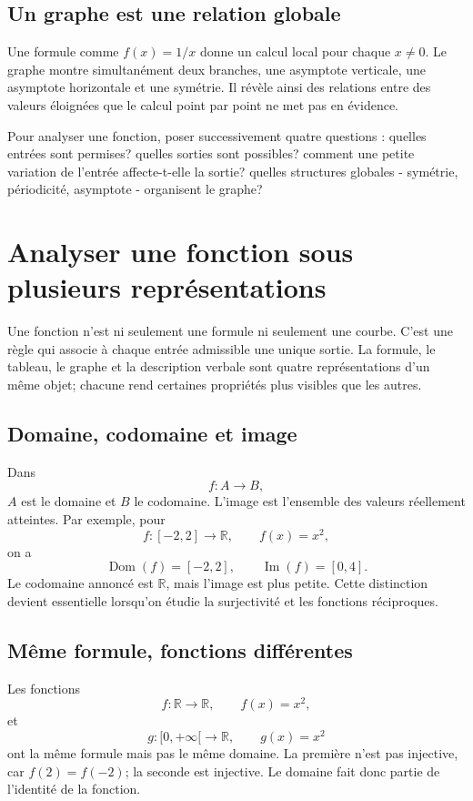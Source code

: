 \documentclass[12pt,a4paper,openany]{book}
\newcommand{\R}{\mathbb{R}}
\newcommand{\dom}{\operatorname{Dom}}
\newcommand{\im}{\operatorname{Im}}
\begin{document}
\subsection{Un graphe est une relation globale}
Une formule comme $f(x)=1/x$ donne un calcul local pour chaque $x\ne0$. Le graphe montre simultanément deux branches, une asymptote verticale, une asymptote horizontale et une symétrie. Il révèle ainsi des relations entre des valeurs éloignées que le calcul point par point ne met pas en évidence.

\begin{connectionbox}
Pour analyser une fonction, poser successivement quatre questions : quelles entrées sont permises? quelles sorties sont possibles? comment une petite variation de l'entrée affecte-t-elle la sortie? quelles structures globales - symétrie, périodicité, asymptote - organisent le graphe?
\end{connectionbox}


\section{Analyser une fonction sous plusieurs représentations}

Une fonction n'est ni seulement une formule ni seulement une courbe. C'est une règle qui associe à chaque entrée admissible une unique sortie. La formule, le tableau, le graphe et la description verbale sont quatre représentations d'un même objet; chacune rend certaines propriétés plus visibles que les autres.

\subsection{Domaine, codomaine et image}

Dans
\[
f:A\longrightarrow B,
\]
$A$ est le domaine et $B$ le codomaine. L'image est l'ensemble des valeurs réellement atteintes. Par exemple, pour
\[
f:[-2,2]\longrightarrow\R,
\qquad f(x)=x^2,
\]
on a
\[
\dom(f)=[-2,2],
\qquad
\im(f)=[0,4].
\]
Le codomaine annoncé est $\R$, mais l'image est plus petite. Cette distinction devient essentielle lorsqu'on étudie la surjectivité et les fonctions réciproques.

\subsection{Même formule, fonctions différentes}

Les fonctions
\[
f:\R\to\R,
\qquad f(x)=x^2,
\]
et
\[
g:[0,+\infty[\to\R,
\qquad g(x)=x^2
\]
ont la même formule mais pas le même domaine. La première n'est pas injective, car $f(2)=f(-2)$; la seconde est injective. Le domaine fait donc partie de l'identité de la fonction.
\end{document}
